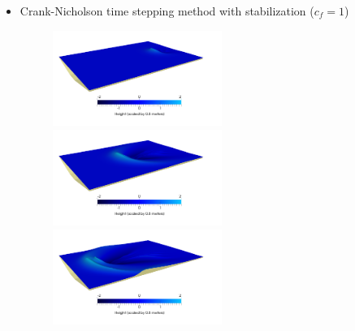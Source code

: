 \documentclass[11pt,a4paper]{article}
\begin{document}
\begin{itemize}
\begin{figure}[!h]
\begin{minipage}[t]{0.3\linewidth}
		\end{minipage}
	\end{figure}
	\item Crank-Nicholson time stepping method with stabilization ($c_f=1$)
	\begin{figure}[!h]
		\begin{minipage}[t]{0.3\linewidth}
			\centering
			\includegraphics[width=5.5cm]{CNStabilized1_150.png}
		\end{minipage}
		\begin{minipage}[t]{0.3\linewidth}
			\centering
			\includegraphics[width=5.5cm]{CNStabilized1_300.png}
		\end{minipage}
		\begin{minipage}[t]{0.3\linewidth}
			\centering
			\includegraphics[width=5.5cm]{CNStabilized1_400.png}
		\end{minipage}
	\end{figure}
\end{itemize}

	\pagebreak
	
\end{document}
